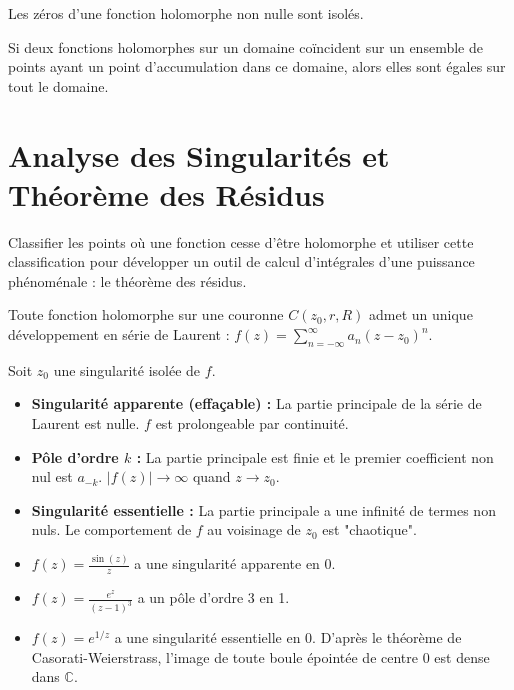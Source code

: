 \begin{theorem}
    Les zéros d'une fonction holomorphe non nulle sont isolés.
\end{theorem}

\begin{corollary}
    Si deux fonctions holomorphes sur un domaine coïncident sur un ensemble de points ayant un point d'accumulation dans ce domaine, alors elles sont égales sur tout le domaine.
\end{corollary}

\section{Analyse des Singularités et Théorème des Résidus}

\begin{objectif}
    Classifier les points où une fonction cesse d'être holomorphe et utiliser cette classification pour développer un outil de calcul d'intégrales d'une puissance phénoménale : le théorème des résidus.
\end{objectif}

\begin{theorem}
    Toute fonction holomorphe sur une couronne $C(z_0, r, R)$ admet un unique développement en série de Laurent : $f(z) = \sum_{n=-\infty}^\infty a_n (z-z_0)^n$.
\end{theorem}

\begin{definition}
    Soit $z_0$ une singularité isolée de $f$.
    \begin{itemize}
        \item \textbf{Singularité apparente (effaçable) :} La partie principale de la série de Laurent est nulle. $f$ est prolongeable par continuité.
        \item \textbf{Pôle d'ordre $k$ :} La partie principale est finie et le premier coefficient non nul est $a_{-k}$. $|f(z)| \to \infty$ quand $z \to z_0$.
        \item \textbf{Singularité essentielle :} La partie principale a une infinité de termes non nuls. Le comportement de $f$ au voisinage de $z_0$ est "chaotique".
    \end{itemize}
\end{definition}

\begin{example}
    \begin{itemize}
        \item $f(z) = \frac{\sin(z)}{z}$ a une singularité apparente en 0.
        \item $f(z) = \frac{e^z}{(z-1)^3}$ a un pôle d'ordre 3 en 1.
        \item $f(z) = e^{1/z}$ a une singularité essentielle en 0. D'après le théorème de Casorati-Weierstrass, l'image de toute boule épointée de centre 0 est dense dans $\mathbb{C}$.
    \end{itemize}
\end{example}

